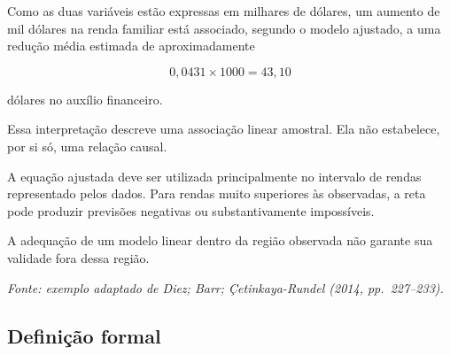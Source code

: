 \documentclass[
  letterpaper,
  DIV=11,
  numbers=noendperiod]{scrreprt}
\begin{document}
\begin{tcolorbox}[enhanced jigsaw, colback=white, leftrule=.75mm, colbacktitle=quarto-callout-note-color!10!white, breakable, titlerule=0mm, bottomtitle=1mm, title=\textcolor{quarto-callout-note-color}{\faInfo}\hspace{0.5em}{Interpretação}, colframe=quarto-callout-note-color-frame, toprule=.15mm, opacityback=0, bottomrule=.15mm, opacitybacktitle=0.6, arc=.35mm, toptitle=1mm, rightrule=.15mm, coltitle=black, left=2mm]

Como as duas variáveis estão expressas em milhares de dólares, um
aumento de mil dólares na renda familiar está associado, segundo o
modelo ajustado, a uma redução média estimada de aproximadamente

\[0{,}0431\times 1000
=
43{,}10\]

dólares no auxílio financeiro.

Essa interpretação descreve uma associação linear amostral. Ela não
estabelece, por si só, uma relação causal.

\end{tcolorbox}

\begin{tcolorbox}[enhanced jigsaw, colback=white, leftrule=.75mm, colbacktitle=quarto-callout-warning-color!10!white, breakable, titlerule=0mm, bottomtitle=1mm, title=\textcolor{quarto-callout-warning-color}{\faExclamationTriangle}\hspace{0.5em}{Extrapolação}, colframe=quarto-callout-warning-color-frame, toprule=.15mm, opacityback=0, bottomrule=.15mm, opacitybacktitle=0.6, arc=.35mm, toptitle=1mm, rightrule=.15mm, coltitle=black, left=2mm]

A equação ajustada deve ser utilizada principalmente no intervalo de
rendas representado pelos dados. Para rendas muito superiores às
observadas, a reta pode produzir previsões negativas ou substantivamente
impossíveis.

A adequação de um modelo linear dentro da região observada não garante
sua validade fora dessa região.

\end{tcolorbox}

\emph{Fonte: exemplo adaptado de Diez; Barr; Çetinkaya-Rundel (2014,
pp.~227--233).}

\subsection{Definição formal}\label{definiuxe7uxe3o-formal-1}
\end{document}
